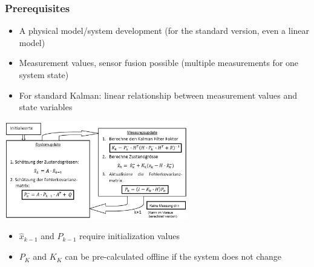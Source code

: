 \subsubsection{Prerequisites}
\begin{itemize}
	\item A physical model/system development (for the standard version, even a
	linear model)
	\item Measurement values, sensor fusion possible (multiple measurements for one
	system state)
	\item For standard Kalman: linear relationship between measurement values and
	state variables
\end{itemize}
\begin{minipage}{8cm}
	\includegraphics[width=8cm]{Content/AdaptSigVer/KalmanFilter.jpg}
	
	\begin{itemize}
		\item $\hat{x}_{k-1}$ and $P_{k-1}$ require initialization values
		\item $P_K$ and $K_K$ can be pre-calculated offline if the system does not change
	\end{itemize}
	
\end{minipage}
